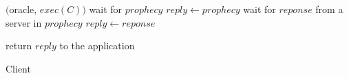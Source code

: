 \begin{algorithm}[h!]
\small

\begin{distribalgo}[1]



\vspace{1.0mm}

		\STATE \amcast$($oracle, $exec(C))$
		\STATE wait for $prophecy$
			\STATE $reply \leftarrow prophecy$
			\STATE wait for $reponse$ from a server in $prophecy$
			\STATE $reply \leftarrow reponse$
		\ENDIF

\STATE return $reply$ to the application

\vspace{1.0mm}



\ENDINDENT

\caption{Client}
\label{alg:client_proxy}
\end{distribalgo}
\end{algorithm}